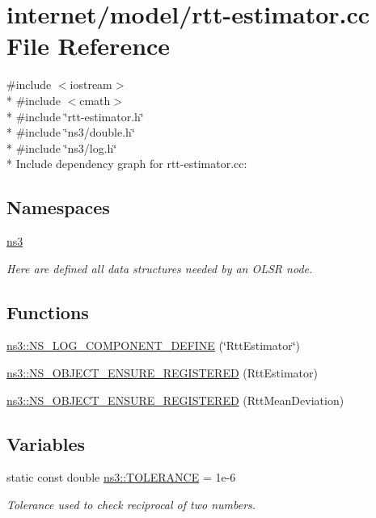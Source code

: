 \hypertarget{rtt-estimator_8cc}{}\section{internet/model/rtt-\/estimator.cc File Reference}
\label{rtt-estimator_8cc}
{\ttfamily \#include $<$iostream$>$}\\*
{\ttfamily \#include $<$cmath$>$}\\*
{\ttfamily \#include \char`\"{}rtt-\/estimator.\+h\char`\"{}}\\*
{\ttfamily \#include \char`\"{}ns3/double.\+h\char`\"{}}\\*
{\ttfamily \#include \char`\"{}ns3/log.\+h\char`\"{}}\\*
Include dependency graph for rtt-\/estimator.cc\+:
\subsection*{Namespaces}
\begin{DoxyCompactItemize}
\item 
 \hyperlink{namespacens3}{ns3}
\begin{DoxyCompactList}\small\item\em Here are defined all data structures needed by an O\+L\+SR node. \end{DoxyCompactList}\end{DoxyCompactItemize}
\subsection*{Functions}
\begin{DoxyCompactItemize}
\item 
\hyperlink{namespacens3_a7be4f1f5c47fccb74cc73e4961fce1e0}{ns3\+::\+N\+S\+\_\+\+L\+O\+G\+\_\+\+C\+O\+M\+P\+O\+N\+E\+N\+T\+\_\+\+D\+E\+F\+I\+NE} (\char`\"{}Rtt\+Estimator\char`\"{})
\item 
\hyperlink{namespacens3_ab5e9e7d11705b2d03fa14ac00417b745}{ns3\+::\+N\+S\+\_\+\+O\+B\+J\+E\+C\+T\+\_\+\+E\+N\+S\+U\+R\+E\+\_\+\+R\+E\+G\+I\+S\+T\+E\+R\+ED} (Rtt\+Estimator)
\item 
\hyperlink{namespacens3_a2a3da0052e09e033a375e5b243a986ce}{ns3\+::\+N\+S\+\_\+\+O\+B\+J\+E\+C\+T\+\_\+\+E\+N\+S\+U\+R\+E\+\_\+\+R\+E\+G\+I\+S\+T\+E\+R\+ED} (Rtt\+Mean\+Deviation)
\end{DoxyCompactItemize}
\subsection*{Variables}
\begin{DoxyCompactItemize}
\item 
static const double \hyperlink{namespacens3_ada892a04090e9c8aba4285b9c6f7008a}{ns3\+::\+T\+O\+L\+E\+R\+A\+N\+CE} = 1e-\/6
\begin{DoxyCompactList}\small\item\em Tolerance used to check reciprocal of two numbers. \end{DoxyCompactList}\end{DoxyCompactItemize}

